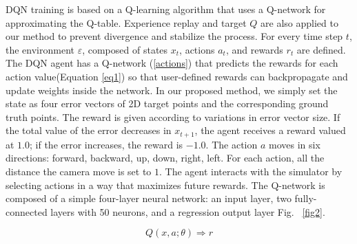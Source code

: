 \documentclass[10pt]{article}
\begin{document}
DQN training is based on a Q-learning\cite{ref1} algorithm that uses a Q-network for approximating the Q-table. Experience replay and target $Q$ are also applied to our method to prevent divergence and stabilize the process. For every time step $t$, the environment $\varepsilon$, composed of states $x_t$, actions $a_t$, and rewards $r_t$ are defined. The DQN agent has a Q-network (\ref{actions}) that predicts the rewards for each action value(Equation \ref{eq1}) so that user-defined rewards can backpropagate and update weights inside the network\cite{ref2}. In our proposed method, we simply set the state as four error vectors of 2D target points and the corresponding ground truth points. The reward is given according to variations in error vector size. If the total value of the error decreases in $x_{t+1}$, the agent receives a reward valued at $1.0$; if the error increases, the reward is $-1.0$. The action $a$ moves in six directions: forward, backward, up, down, right, left. For each action, all the distance the camera move is set to $1$. The agent interacts with the simulator by selecting actions in a way that maximizes future rewards. The Q-network is composed of a simple four-layer neural network: an input layer, two fully-connected layers with 50 neurons, and a regression output layer Fig. ~\ref{fig2}.

\begin{equation}\label{eq1}
  Q(x, a ; \theta) \Rightarrow r
\end{equation}
\end{document}
